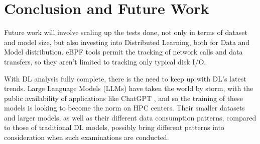 \documentclass[conference]{IEEEtran}
\begin{document}
\section{Conclusion and Future Work}



Future work will involve scaling up the tests done, not only in terms of dataset and model size, but also investing into Distributed Learning, both for Data and Model distribution. eBPF tools permit the tracking of network calls and data transfers, so they aren't limited to tracking only typical disk I/O.

With DL analysis fully complete, there is the need to keep up with DL's latest trends. Large Language Models (LLMs) have taken the world by storm, with the public availability of applications like ChatGPT \cite{chatgpt}, and so the training of these models is looking to become the norm on HPC centers. Their smaller datasets and larger models, as well as their different data consumption patterns, compared to those of traditional DL models, possibly bring different patterns into consideration when such examinations are conducted.


\end{document}
